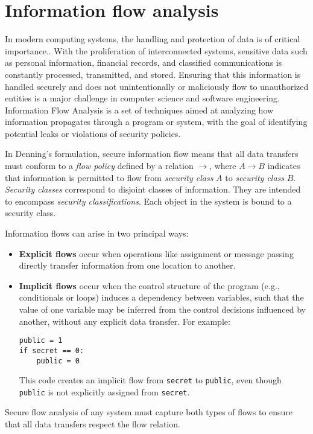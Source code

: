 \documentclass[12pt,a4paper,twoside]{book}
\begin{document}
\section{Information flow analysis}
In modern computing systems, the handling and protection of data is of critical importance.\cite{iso27001_2022}. With the proliferation of interconnected systems, sensitive data such as personal information, financial records, and classified communications is constantly processed, transmitted, and stored\cite{zhang2022data}. Ensuring that this information is handled securely and does not unintentionally or maliciously flow to unauthorized entities is a major challenge in computer science and software engineering\cite{zhang2022data}. Information Flow Analysis\cite{denning1976lattice} is a set of techniques aimed at analyzing how information propagates through a program or system, with the goal of identifying potential leaks or violations of security policies.

In Denning's formulation\cite{denning1976lattice}, secure information flow means that all data transfers must conform to a \textit{flow policy} defined by a relation \( \rightarrow \), where \( A \rightarrow B \) indicates that information is permitted to flow from \textit{security class} \( A \) to \textit{security class} \( B \).
\textit{Security classes} correspond to disjoint classes of information. They are intended to encompass \textit{security classifications}. Each object in the system is bound to a security class.

Information flows can arise in two principal ways:
\begin{itemize}
  \item \textbf{Explicit flows} occur when operations like assignment or message passing directly transfer information from one location to another.
  \item \textbf{Implicit flows} occur when the control structure of the program (e.g., conditionals or loops) induces a dependency between variables, such that the value of one variable may be inferred from the control decisions influenced by another, without any explicit data transfer. For example:
\begin{lstlisting}[caption={Example of implicit flow}, label={lst:implicit_flow}]
public = 1
if secret == 0:
    public = 0
\end{lstlisting}
This code creates an implicit flow from \texttt{secret} to \texttt{public}, even though \texttt{public} is not explicitly assigned from \texttt{secret}.
\end{itemize}
Secure flow analysis of any system must capture both types of flows to ensure that all data transfers respect the flow relation.
\end{document}
